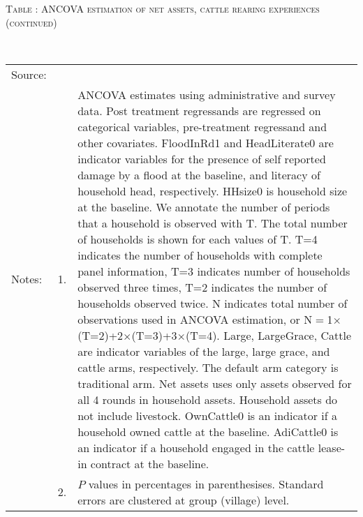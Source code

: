 \addtocounter{table}{-1}
\hspace{-1cm}\begin{minipage}[t]{14cm}
\hfil\textsc{\normalsize Table \thetable: ANCOVA estimation of net assets, cattle rearing experiences (continued)\label{tab ANCOVA net assets experience 2}}\\
\setlength{\tabcolsep}{1pt}
\setlength{\baselineskip}{8pt}
\renewcommand{\arraystretch}{.52}
\hfil{}\\
\renewcommand{\arraystretch}{.8}
\setlength{\tabcolsep}{1pt}
\begin{tabular}{>{\hfill\scriptsize}p{1cm}<{}>{\hfill\scriptsize}p{.25cm}<{}>{\scriptsize}p{12cm}<{\hfill}}
Source:& \multicolumn{2}{l}{\scriptsize Estimated with GUK administrative and survey data.}\\
Notes: & 1. & ANCOVA estimates using administrative and survey data. Post treatment regressands are regressed on categorical variables, pre-treatment regressand and other covariates. \textsf{FloodInRd1} and \textsf{HeadLiterate0} are indicator variables for the presence of self reported damage by a flood at the baseline, and literacy of household head, respectively. \textsf{HHsize0} is household size at the baseline. We annotate the number of periods that a household is observed with \textsf{T}. The total number of households is shown for each values of \textsf{T}. \textsf{T=4} indicates the number of households with complete panel information, \textsf{T=3} indicates number of households observed three times, \textsf{T=2} indicates the number of households observed twice. \textsf{N} indicates total number of observations used in ANCOVA estimation, or \textsf{N$=$1$\times$(T=2)+2$\times$(T=3)+3$\times$(T=4)}.  \textsf{Large}, \textsf{LargeGrace}, \textsf{Cattle} are indicator variables of the \textsf{large}, \textsf{large grace}, and \textsf{cattle} arms, respectively. The default arm category is \textsf{traditional} arm. Net assets uses only assets observed for all 4 rounds in household assets. Household assets do not include livestock. \textsf{OwnCattle0} is an indicator if a household owned cattle at the baseline. \textsf{AdiCattle0} is an indicator if a household engaged in the cattle lease-in contract at the baseline.  \\
& 2. & $P$ values in percentages in parenthesises. Standard errors are clustered at group (village) level.
\end{tabular}
\end{minipage}



